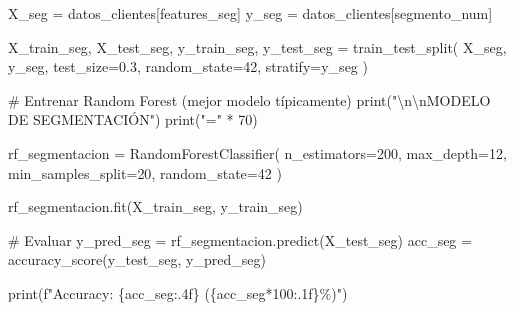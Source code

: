 \documentclass[
  doc,
  floatsintext,
  longtable,
  a4paper,
  nolmodern,
  notxfonts,
  notimes,
  12pt,
  colorlinks=true,linkcolor=blue,citecolor=blue,urlcolor=blue]{apa7}
\newenvironment{Shaded}{\begin{snugshade}}{\end{snugshade}}
\newcommand{\BuiltInTok}[1]{\textcolor[rgb]{0.00,0.23,0.31}{#1}}
\newcommand{\CharTok}[1]{\textcolor[rgb]{0.13,0.47,0.30}{#1}}
\newcommand{\CommentTok}[1]{\textcolor[rgb]{0.37,0.37,0.37}{#1}}
\newcommand{\DecValTok}[1]{\textcolor[rgb]{0.68,0.00,0.00}{#1}}
\newcommand{\FloatTok}[1]{\textcolor[rgb]{0.68,0.00,0.00}{#1}}
\newcommand{\NormalTok}[1]{\textcolor[rgb]{0.00,0.23,0.31}{#1}}
\newcommand{\OperatorTok}[1]{\textcolor[rgb]{0.37,0.37,0.37}{#1}}
\newcommand{\SpecialCharTok}[1]{\textcolor[rgb]{0.37,0.37,0.37}{#1}}
\newcommand{\SpecialStringTok}[1]{\textcolor[rgb]{0.13,0.47,0.30}{#1}}
\newcommand{\StringTok}[1]{\textcolor[rgb]{0.13,0.47,0.30}{#1}}
\begin{document}
\begin{Shaded}
\begin{Highlighting}[]
\NormalTok{X\_seg }\OperatorTok{=}\NormalTok{ datos\_clientes[features\_seg]}
\NormalTok{y\_seg }\OperatorTok{=}\NormalTok{ datos\_clientes[}\StringTok{\textquotesingle{}segmento\_num\textquotesingle{}}\NormalTok{]}

\NormalTok{X\_train\_seg, X\_test\_seg, y\_train\_seg, y\_test\_seg }\OperatorTok{=}\NormalTok{ train\_test\_split(}
\NormalTok{    X\_seg, y\_seg, test\_size}\OperatorTok{=}\FloatTok{0.3}\NormalTok{, random\_state}\OperatorTok{=}\DecValTok{42}\NormalTok{, stratify}\OperatorTok{=}\NormalTok{y\_seg}
\NormalTok{)}

\CommentTok{\# Entrenar Random Forest (mejor modelo típicamente)}
\BuiltInTok{print}\NormalTok{(}\StringTok{"}\CharTok{\textbackslash{}n\textbackslash{}n}\StringTok{MODELO DE SEGMENTACIÓN"}\NormalTok{)}
\BuiltInTok{print}\NormalTok{(}\StringTok{"="} \OperatorTok{*} \DecValTok{70}\NormalTok{)}

\NormalTok{rf\_segmentacion }\OperatorTok{=}\NormalTok{ RandomForestClassifier(}
\NormalTok{    n\_estimators}\OperatorTok{=}\DecValTok{200}\NormalTok{,}
\NormalTok{    max\_depth}\OperatorTok{=}\DecValTok{12}\NormalTok{,}
\NormalTok{    min\_samples\_split}\OperatorTok{=}\DecValTok{20}\NormalTok{,}
\NormalTok{    random\_state}\OperatorTok{=}\DecValTok{42}
\NormalTok{)}

\NormalTok{rf\_segmentacion.fit(X\_train\_seg, y\_train\_seg)}

\CommentTok{\# Evaluar}
\NormalTok{y\_pred\_seg }\OperatorTok{=}\NormalTok{ rf\_segmentacion.predict(X\_test\_seg)}
\NormalTok{acc\_seg }\OperatorTok{=}\NormalTok{ accuracy\_score(y\_test\_seg, y\_pred\_seg)}

\BuiltInTok{print}\NormalTok{(}\SpecialStringTok{f"Accuracy: }\SpecialCharTok{\{}\NormalTok{acc\_seg}\SpecialCharTok{:.4f\}}\SpecialStringTok{ (}\SpecialCharTok{\{}\NormalTok{acc\_seg}\OperatorTok{*}\DecValTok{100}\SpecialCharTok{:.1f\}}\SpecialStringTok{\%)"}\NormalTok{)}


\end{Highlighting}
\end{Shaded}
\end{document}
